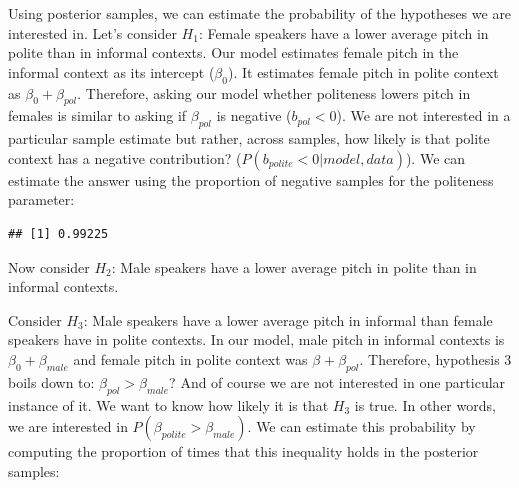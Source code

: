\documentclass[]{book}
\newenvironment{Shaded}{\begin{snugshade}}{\end{snugshade}}
\newcommand{\DecValTok}[1]{\textcolor[rgb]{0.00,0.00,0.81}{#1}}
\newcommand{\KeywordTok}[1]{\textcolor[rgb]{0.13,0.29,0.53}{\textbf{#1}}}
\newcommand{\NormalTok}[1]{#1}
\newcommand{\OperatorTok}[1]{\textcolor[rgb]{0.81,0.36,0.00}{\textbf{#1}}}
\newcommand{\StringTok}[1]{\textcolor[rgb]{0.31,0.60,0.02}{#1}}
\begin{document}
Using posterior samples, we can estimate the probability of the hypotheses we are interested in. Let's consider \(H_1\): Female speakers have a lower average pitch in polite than in informal contexts. Our model estimates female pitch in the informal context as its intercept (\(\beta_0\)). It estimates female pitch in polite context as \(\beta_0 + \beta_{pol}\). Therefore, asking our model whether politeness lowers pitch in females is similar to asking if \(\beta_{pol}\) is negative (\(b_{pol} < 0\)). We are not interested in a particular sample estimate but rather, across samples, how likely is that polite context has a negative contribution? (\(P(b_{polite} < 0 | model, data)\)). We can estimate the answer using the proportion of negative samples for the politeness parameter:

\begin{Shaded}
\end{Shaded}

\begin{verbatim}
## [1] 0.99225
\end{verbatim}

Now consider \(H_2\): Male speakers have a lower average pitch in polite than in informal contexts.

Consider \(H_3\): Male speakers have a lower average pitch in informal than female
speakers have in polite contexts. In our model, male pitch in informal contexts is \(\beta_{0}+ \beta_{male}\) and female pitch in polite context was \(\beta_{} + \beta_{pol}\). Therefore, hypothesis 3 boils down to: \(\beta_{pol} > \beta_{male}\)? And of course we are not interested in one particular instance of it. We want to know how likely it is that \(H_3\) is true. In other words, we are interested in \(P(\beta_{polite} > \beta_{male})\). We can estimate this probability by computing the proportion of times that this inequality holds in the posterior samples:

\begin{Shaded}
\end{Shaded}
\end{document}
